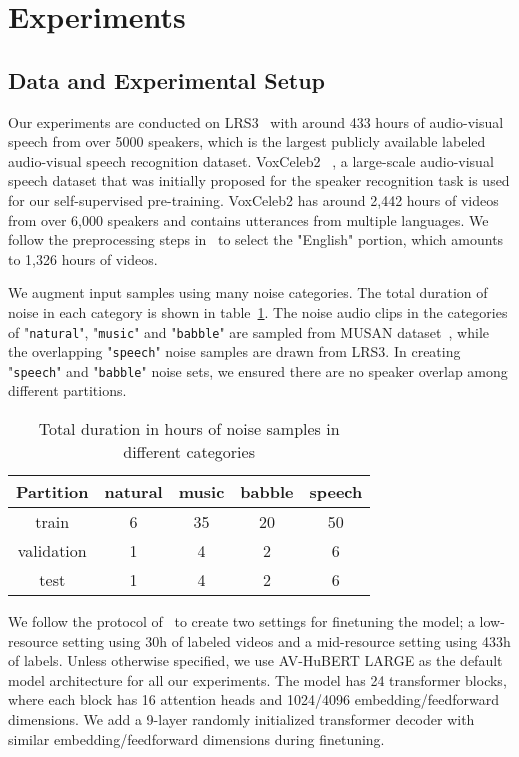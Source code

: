 \section{Experiments}
\label{sec:exp}


\subsection{Data and Experimental Setup}
\label{sec:exp-data-setup}
Our experiments are conducted on LRS3~\cite{afouras2018lrs3} with around 433 hours of audio-visual speech from over 5000 speakers, which is the largest publicly available labeled audio-visual speech recognition dataset. VoxCeleb2~
\cite{voxceleb2}, a large-scale audio-visual speech dataset that was initially proposed for the speaker recognition task is used for our self-supervised pre-training. VoxCeleb2 has around 2,442 hours of videos from over 6,000 speakers and contains utterances from multiple languages. We follow the preprocessing steps in~\cite{avhubert} to select the "English" portion, which amounts to 1,326 hours of videos.

We augment input samples using many noise categories. The total duration of noise in each category is shown in table~\ref{tab:noise-amount}. The noise audio clips in the categories of "\texttt{natural}", "\texttt{music}" and "\texttt{babble}" are sampled from MUSAN dataset~\cite{Snyder2015MUSANAM}, while the overlapping "\texttt{speech}" noise samples are drawn from LRS3. In creating "\texttt{speech}" and "\texttt{babble}" noise sets, we ensured there are no speaker overlap among different partitions.

\begin{table}[htp]
    \centering
    \caption{\label{tab:noise-amount}Total duration in hours of noise samples in different categories}
    \begin{tabular}{ccccc}
    \toprule
    Partition & natural & music & babble & speech \\
    \midrule
        train & 6 & 35 & 20 & 50 \\
        validation & 1 & 4 & 2 & 6\\
        test & 1 & 4 & 2 & 6\\
        \bottomrule
    \end{tabular}
\end{table}

We follow the protocol of~\cite{avhubert} to create two settings for finetuning the model; a low-resource setting using 30h of labeled videos and a mid-resource setting using 433h of labels. Unless otherwise specified, we use AV-HuBERT LARGE as the default model architecture for all our experiments. The model has 24 transformer blocks, where each block has 16 attention heads and 1024/4096 embedding/feedforward dimensions. We add a 9-layer randomly initialized transformer decoder with similar embedding/feedforward dimensions during finetuning.

